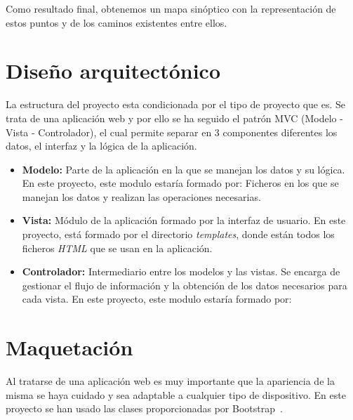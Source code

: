 Como resultado final, obtenemos un mapa sinóptico con la representación de estos puntos y de los caminos existentes entre ellos.


\section{Diseño arquitectónico}

La estructura del proyecto esta condicionada por el tipo de proyecto que es. Se trata de una aplicación web y por ello se ha seguido el patrón MVC (Modelo - Vista - Controlador), el cual permite separar en 3 componentes diferentes los datos, el interfaz y la lógica de la aplicación. 

\begin{itemize}
	\item \textbf{Modelo:} Parte de la aplicación en la que se manejan los datos y su lógica. En este proyecto, este modulo estaría formado por:
	Ficheros en los que se manejan los datos y realizan las operaciones necesarias.
	\item \textbf{Vista:} Módulo de la aplicación formado por la interfaz de usuario. En este proyecto, está formado por el directorio \textit{templates}, donde están todos los ficheros \textit{HTML} que se usan en la aplicación.
	\item \textbf{Controlador:} Intermediario entre los modelos y las vistas. Se encarga de gestionar el flujo de información y la obtención de los datos necesarios para cada vista. En este proyecto, este modulo estaría formado por:
\end{itemize}


\section{Maquetación}
Al tratarse de una aplicación web es muy importante que la apariencia de la misma se haya cuidado y sea adaptable a cualquier tipo de dispositivo. En este proyecto se han usado las clases proporcionadas por Bootstrap~\cite{doc:bootstrap}.


